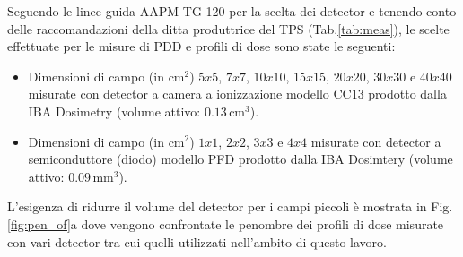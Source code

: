 Seguendo le linee guida AAPM TG-120 per la scelta dei detector \cite{Low2011} e tenendo conto delle raccomandazioni della ditta produttrice del TPS (Tab.\ref{tab:meas}), le scelte effettuate per le misure di PDD e profili di dose sono state le seguenti:
\begin{itemize}
\item Dimensioni di campo (in cm$^2$) $5x5$, $7x7$, $10x10$, $15x15$, $20x20$, $30x30$ e $40x40$ misurate con detector a camera a ionizzazione modello CC13 prodotto dalla IBA Dosimetry (volume attivo: $0.13\,$cm$^3$).
\item Dimensioni di campo (in cm$^2$) $1x1$, $2x2$, $3x3$ e $4x4$ misurate con detector a semiconduttore (diodo) modello PFD prodotto dalla IBA Dosimtery (volume attivo: $0.09\,$mm$^3$).
\end{itemize}
L'esigenza di ridurre il volume del detector per i campi piccoli è mostrata in Fig.\ref{fig:pen_of}a dove vengono confrontate le penombre dei profili di dose misurate con vari detector tra cui quelli utilizzati nell'ambito di questo lavoro.
